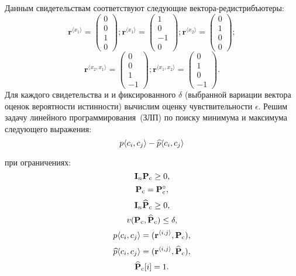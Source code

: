Данным свидетельствам соответствуют следующие вектора-редистрибъютеры:
\begin{equation*}
\mathbf{r}^{\langle x_{1} \rangle} = \begin{pmatrix} 0 \\ 0 \\ 1 \\ 0 \end{pmatrix}; 
\mathbf{r}^{\langle x_{1} \rangle} = \begin{pmatrix} 1 \\ 0 \\ -1 \\ 0 \end{pmatrix};
\mathbf{r}^{\langle x_{2} \rangle} = \begin{pmatrix} 0 \\ 1 \\ 0 \\ 0 \end{pmatrix}; 
\end{equation*}
\begin{equation*}
\mathbf{r}^{\langle x_{2}, x_{1} \rangle} = \begin{pmatrix} 0 \\ 0 \\ 1 \\ -1 \end{pmatrix};
\mathbf{r}^{\langle x_{1}, x_{2} \rangle} = \begin{pmatrix} 0 \\ 1 \\ 0 \\ -1 \end{pmatrix}.
\end{equation*}
Для каждого свидетельства и и фиксированного $\delta$ (выбранной вариации вектора оценок вероятности истинности) вычислим оценку чувствительности $\epsilon$. Решим задачу линейного программирования~(ЗЛП) по поиску минимума и максимума следующего выражения:
\begin{equation*}
p\langle c_{i}, c_{j} \rangle - \widehat{p}\langle c_{i}, c_{j} \rangle
\end{equation*}

\noindent при ограничениях:
\begin{equation}\label{eq:boundary1} \mathbf{I}_n \mathbf{P}_\mathrm{c}\geq 0,\end{equation}
\begin{equation}\label{eq:boundary2} \mathbf{P}_\mathrm{c} = \mathbf{P}_\mathrm{c}^{\circ},    \end{equation}
\begin{equation}\label{eq:boundary3}\mathbf{I}_n \mathbf{\widehat{P}}_\mathrm{c} \geq 0,    \end{equation}
\begin{equation}\label{eq:boundary4} v(\mathbf{P}_\mathrm{c}, \mathbf{\widehat{P}}_\mathrm{c}) \leq \delta,    \end{equation}
\begin{equation}\label{eq:boundary5}p\langle c_{i}, c_{j} \rangle=(\mathbf{r}^{\langle i, j \rangle},\mathbf{P}_\mathrm{c}),     \end{equation}
\begin{equation}\label{eq:boundary6}\widehat{p}\langle c_{i}, c_{j} \rangle=(\mathbf{r}^{\langle i, j \rangle},\mathbf{\widehat{P}}_\mathrm{c}),    \end{equation}
\begin{equation}\label{eq:boundary7} \mathbf{\widehat{P}}_\mathrm{c}[i] = 1.\end{equation}

